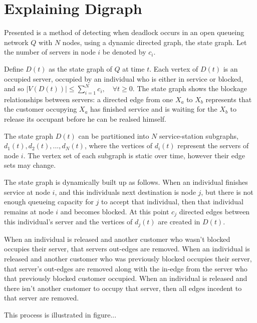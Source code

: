 \documentclass{article}
\begin{document}
\section{Explaining Digraph}

Presented is a method of detecting when deadlock occurs in an open queueing network $Q$ with $N$ nodes, using a dynamic directed graph, the state graph.
Let the number of servers in node $i$ be denoted by $c_i$.\newline

Define $D(t)$ as the state graph of $Q$ at time $t$.
Each vertex of $D(t)$ is an occupied server, occupied by an individual who is either in service or blocked, and so $\left| V\left(D\left(t\right)\right) \right| \leq \sum_{i=1}^N c_i, \quad \forall t \geq 0$.
The state graph shows the blockage relationships between servers: a directed edge from one $X_a$ to $X_b$ represents that the customer occupying $X_a$ has finished service and is waiting for the $X_b$ to release its occupant before he can be realsed himself.\newline

The state graph $D(t)$ can be partitioned into $N$ service-station subgraphs, $d_1(t), d_2(t), ..., d_N(t)$, where the vertices of $d_i(t)$ represent the servers of node $i$.
The vertex set of each subgraph is static over time, however their edge sets may change.\newline

The state graph is dynamically built up as follows.
When an individual finishes service at node $i$, and this individuals next destination is node $j$, but there is not enough queueing capacity for $j$ to accept that individual, then that individual remains at node $i$ and becomes blocked.
At this point $c_j$ directed edges between this individual's server and the vertices of $d_j(t)$ are created in $D(t)$.\newline

When an individual is released and another customer who wasn't blocked occupies their server, that servers out-edges are removed.
When an individual is released and another customer who was previously blocked occupies their server, that server's out-edges are removed along with the in-edge from the server who that previously blocked customer occupied.
When an individual is released and there isn't another customer to occupy that server, then all edges incedent to that server are removed.\newline

This process is illustrated in figure...
\end{document}
